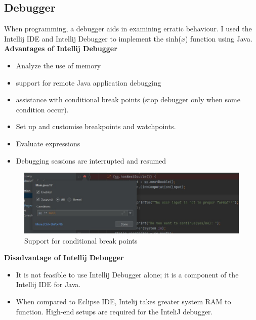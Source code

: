 \documentclass[
	12pt
]{article}
\begin{document}
\subsection{Debugger}
When programming, a debugger aids in examining erratic behaviour.
I used the Intellij IDE and Intellij Debugger to implement the sinh($x$) function using Java.\\
\newline\textbf{Advantages of Intellij Debugger}
\begin{itemize}
    \item Analyze the use of memory
    \item support for remote Java application debugging
    \item assistance with conditional break points (stop debugger only when some condition occur)\cite{debuggingtools}.
    \item Set up and customise breakpoints and watchpoints.
    \item Evaluate expressions
    \item Debugging sessions are interrupted and resumed

\end{itemize}
\begin{figure}[htp]
    \centering
    \includegraphics[width=12cm]{inlineDebug.jpg}
    \caption{Support for conditional break points}
    \label{Support for conditional break points}
\end{figure}
\newpage
\textbf{Disadvantage of Intellij Debugger}
\begin{itemize}
    \item It is not feasible to use Intellij Debugger alone; it is a component of the Intellij IDE for Java.
    \item When compared to Eclipse IDE, Intelij takes greater system RAM to function\cite{eclipsevsintelij}. High-end setups are required for the InteliJ debugger.
\end{itemize}
\end{document}
